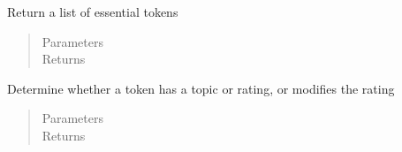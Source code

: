 \documentclass[letterpaper,10pt,english]{sphinxmanual}
\begin{document}
\begin{fulllineitems}
\label{\detokenize{index:Fralysis.AnalyseDream.essential_tokens}}
Return a list of essential tokens
\begin{quote}\begin{description}
\item[{Parameters}] \leavevmode
{} \textendash{} 

\item[{Returns}] \leavevmode


\end{description}\end{quote}

\end{fulllineitems}


\begin{fulllineitems}
\label{\detokenize{index:Fralysis.AnalyseDream.is_essential}}
Determine whether a token has a topic or rating, or modifies the rating
\begin{quote}\begin{description}
\item[{Parameters}] \leavevmode
{} \textendash{} 

\item[{Returns}] \leavevmode


\end{description}\end{quote}

\end{fulllineitems}

\end{document}
